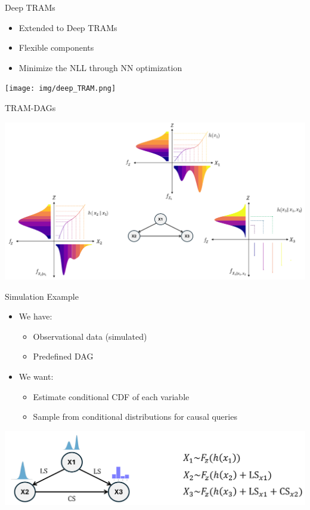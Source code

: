 \documentclass[onlytextwidth,english]{beamer}\usepackage[]{graphicx}\usepackage[]{xcolor}
\begin{document}
\begin{frame}{Deep TRAMs}
  \begin{itemize}
    \item Extended to Deep TRAMs \citep{sick2020}
    \item Flexible components
    \item Minimize the NLL through NN optimization
  \end{itemize}

  \vfill
  \centering
  \texttt{[image: img/deep\_TRAM.png]}
\end{frame}





\begin{frame}{TRAM-DAGs}

  \centering
  \includegraphics[width=1\linewidth]{img/TRAM_DAG.png}
\end{frame}



\begin{frame}{Simulation Example}
  \begin{itemize}
    \item We have:
    \begin{itemize}
      \item Observational data (simulated)
      \item Predefined DAG
    \end{itemize}
    \item We want:
    \begin{itemize}
      \item Estimate conditional CDF of each variable
      \item Sample from conditional distributions for causal queries
    \end{itemize}
  \end{itemize}

  \vfill
  \centering
  \includegraphics[width=0.7\linewidth]{img/Simulation_Example.png}
\end{frame}
\end{document}
